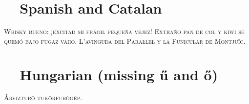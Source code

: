 \documentclass{article}
\def\checkno	{\textcolor{red}{\textbf{\ding{55}~~}}}
\def\checkyes	{\textcolor{green}{\textbf{\ding{51}~~}}}
\begin{document}
\vspace{-1em}\section*{\checkyes Spanish and Catalan}
\noindent\textsc{
Whisky bueno: ¡excitad mi frágil pequeña vejez!
Extraño pan de col y kiwi se quemó bajo fugaz vaho. 
L'avinguda del Paraŀlel y la Funicular de Montjuïc.
}

\vspace{-1em}\section*{\checkno Hungarian (missing ű and ő)}
\noindent\textsc{
Árvíztűrő tükörfúrógép.
}
\end{document}
